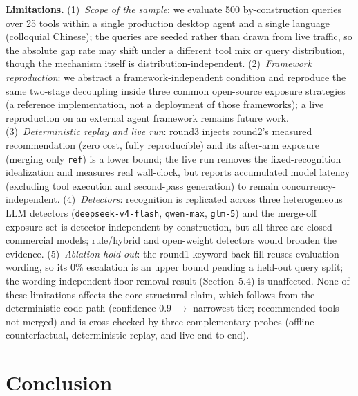 \textbf{Limitations.} (1)~\emph{Scope of the sample}: we evaluate 500 by-construction queries over 25 tools within a single production desktop agent and a single language (colloquial Chinese); the queries are seeded rather than drawn from live traffic, so the absolute gap rate may shift under a different tool mix or query distribution, though the mechanism itself is distribution-independent. (2)~\emph{Framework reproduction}: we abstract a framework-independent condition and reproduce the same two-stage decoupling inside three common open-source exposure strategies (a reference implementation, not a deployment of those frameworks); a live reproduction on an external agent framework remains future work. (3)~\emph{Deterministic replay and live run}: round3 injects round2's measured recommendation (zero cost, fully reproducible) and its after-arm exposure (merging only \texttt{ref}) is a lower bound; the live run removes the fixed-recognition idealization and measures real wall-clock, but reports accumulated model latency (excluding tool execution and second-pass generation) to remain concurrency-independent. (4)~\emph{Detectors}: recognition is replicated across three heterogeneous LLM detectors (\texttt{deepseek-v4-flash}, \texttt{qwen-max}, \texttt{glm-5}) and the merge-off exposure set is detector-independent by construction, but all three are closed commercial models; rule/hybrid and open-weight detectors would broaden the evidence. (5)~\emph{Ablation hold-out}: the round1 keyword back-fill reuses evaluation wording, so its 0\% escalation is an upper bound pending a held-out query split; the wording-independent floor-removal result (Section~5.4) is unaffected. None of these limitations affects the core structural claim, which follows from the deterministic code path (confidence 0.9 $\rightarrow$ narrowest tier; recommended tools not merged) and is cross-checked by three complementary probes (offline counterfactual, deterministic replay, and live end-to-end).

\section{Conclusion}
\label{sec:conclusion}


